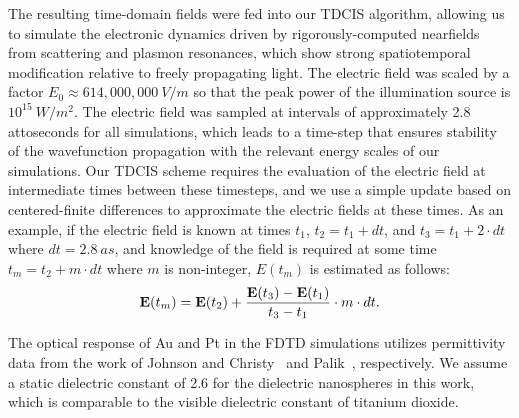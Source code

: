 \documentclass[journal=jpclcd,manuscript=suppinfo]{achemso}
\begin{document}
The resulting time-domain fields were fed into our TDCIS algorithm, allowing us to simulate the electronic dynamics
driven by rigorously-computed nearfields from scattering and plasmon resonances, which show strong spatiotemporal modification relative
to freely propagating light.  The electric field was scaled by a factor $E_0 \approx 614,000,000 \: V/m$ so that the peak power
of the illumination source is $10^{15} \: W/m^2$.  The electric field was sampled at intervals of approximately 2.8 attoseconds for all simulations, which leads
to a time-step that ensures stability of
the wavefunction propagation with the relevant energy scales of our simulations.  Our TDCIS scheme
requires the evaluation of the electric field at intermediate times between these timesteps, and we use a simple update
based on centered-finite differences to approximate the electric fields at these times.  As an example, if the 
electric field is known at times $t_1$, $t_2 = t_1 + dt$, and $t_3 = t_1 + 2\cdot dt$ where $dt = 2.8 \: as$, and knowledge
of the field is required at some time $t_m = t_2 + m\cdot dt$ where $m$ is non-integer, $E(t_m)$ is estimated as follows: 
\begin{equation}
{\bf E}(t_m) =  {\bf E}(t_2) + \frac{{\bf E}(t_3)-{\bf E}(t_1) }{t_3 - t_1 } \cdot m\cdot dt.
\end{equation}

The optical response of Au and Pt in the FDTD simulations utilizes permittivity data from the work of Johnson and Christy~\cite{JC_PRB_1972} and Palik~\cite{Palik}, respectively.  We assume a static dielectric constant of 2.6 for
the dielectric nanospheres in this work, which is comparable to the visible dielectric constant of titanium dioxide. 

 
\end{document}

